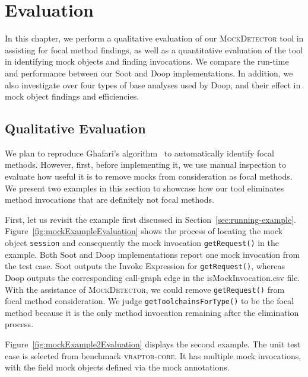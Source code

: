 \chapter{Evaluation}
\label{chap:evaluation}	

In this chapter, we perform a qualitative evaluation of our \textsc{MockDetector} tool in assisting for focal method findings, as well as a quantitative evaluation of the tool in identifying mock objects and finding invocations. We compare the run-time and performance between our Soot and Doop implementations. In addition, we also investigate over four types of base analyses used by Doop, and their effect in mock object findings and efficiencies.

\section{Qualitative Evaluation}

We plan to reproduce Ghafari's algorithm~\cite{ghafari15:_autom} to automatically identify focal methods. However, first, before implementing it, we use manual inspection to evaluate how useful it is to remove mocks from consideration as focal methods. We present two examples in this section to showcase how our tool eliminates method invocations that are definitely not focal methods.

First, let us revisit the example first discussed in Section~\ref{sec:running-example}. Figure~\ref{fig:mockExampleEvaluation} shows the process of locating the mock object \texttt{session} and consequently the mock invocation \texttt{getRequest()} in the example. Both Soot and Doop implementations report one mock invocation from the test case. Soot outputs the Invoke Expression for \texttt{getRequest()}, whereas Doop outputs the corresponding call-graph edge in the isMockInvocation.csv file. With the assistance of \textsc{MockDetector}, we could remove \texttt{getRequest()} from focal method consideration. We judge \texttt{getToolchainsForType()} to be the focal method because it is the only method invocation remaining after the elimination process. 

Figure~\ref{fig:mockExample2Evaluation} displays the second example. The unit test case is selected from benchmark \textsc{vraptor-core}. It has multiple mock invocations, with the field mock objects defined via the mock annotations. 


